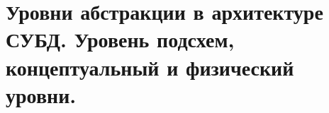 {
	\section{Уровни абстракции в архитектуре СУБД. Уровень подсхем, концептуальный и физический уровни.}
	\newpage
}
